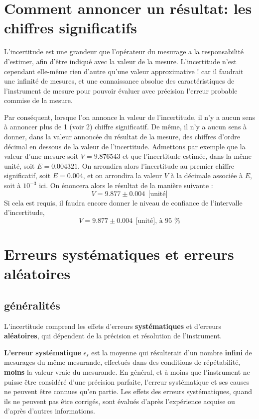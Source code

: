 \section{Comment annoncer un résultat: les chiffres significatifs}

L'incertitude est une grandeur que l'opérateur du mesurage a la responsabilité d'estimer, afin d'être indiqué avec la valeur de la mesure. L'incertitude n'est cependant elle-même rien d'autre qu'une valeur approximative ! car il faudrait une infinité de mesures, et une connaissance absolue des caractéristiques de l'instrument de mesure pour pouvoir évaluer avec précision l'erreur probable commise de la mesure.

Par conséquent, lorsque l'on annonce la valeur de l'incertitude, il n'y a aucun sens à annoncer plus de 1 (voir 2) chiffre significatif. De même, il n'y a aucun sens à donner, dans la valeur annoncée du résultat de la mesure, des chiffres d'ordre décimal en dessous de la valeur de l'incertitude. Admettons par exemple que la valeur d'une mesure soit $V=9.876543$ et que l'incertitude estimée, dans la même unité, soit $E=0.004321$. On arrondira alors l'incertitude au premier chiffre significatif, soit $E=0.004$, et on arrondira la valeur $V$ à la décimale associée à $E$, soit à $10^{-3}$ ici. On énoncera alors le résultat de la manière suivante :
$$
V=9.877\pm0.004\ \ \text{[unité]}
$$
Si cela est requis, il faudra encore donner le niveau de confiance de l'intervalle d'incertitude,
$$
V=9.877\pm0.004\ \ \text{[unité], à 95 \%}
$$

\section{Erreurs systématiques et erreurs aléatoires}

\subsection{généralités}

L'incertitude comprend les effets d'erreurs \textbf{systématiques} et d'erreurs \textbf{aléatoires}, qui dépendent de la précision et résolution de l'instrument.

\textbf{L'erreur systématique} $\epsilon_s$ est la moyenne qui résulterait d'un nombre \textbf{infini} de mesurages du même mesurande, effectués dans des conditions de répétabilité, \textbf{moins} la valeur vraie du mesurande. En général, et à moins que l'instrument ne puisse être considéré d'une précision parfaite, l'erreur systématique et ses causes ne peuvent être connues qu'en partie. Les effets des erreurs systématiques, quand ils ne peuvent pas être corrigés, sont évalués d'après l'expérience acquise ou d'après d'autres informations.

